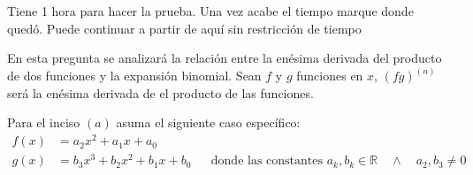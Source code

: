 \documentclass[spanish,12pt]{article}
\newcommand{\R}{\mathbb{R}}
\begin{document}
 Tiene 1 hora para hacer la prueba. Una vez acabe el tiempo marque donde quedó. Puede continuar a partir de aquí sin restricción de tiempo 
 

En esta pregunta se analizará la relación entre la enésima derivada del producto de dos funciones y la expansión binomial. Sean $f$ y $g$ funciones en $x$, $(fg)^{(n)}$ será la enésima derivada de el producto de las funciones.

Para el inciso $(a)$ asuma el siguiente caso específico:
\begin{align*}
    f(x)&=a_2x^2+a_1x+a_0\\
    g(x)&=b_3x^3+b_2x^2+b_1x+b_0 && \text{donde las constantes } a_k, b_k\in\R\quad\wedge\quad a_2,b_3\neq0\\
\end{align*}
\end{document}
